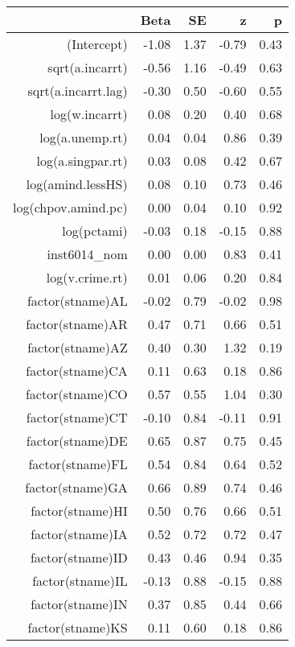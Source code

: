 \begin{table}[ht]
\centering
\begin{tabular}{rrrrr}
  \hline
 & Beta & SE & z & p \\ 
  \hline
(Intercept) & -1.08 & 1.37 & -0.79 & 0.43 \\ 
  sqrt(a.incarrt) & -0.56 & 1.16 & -0.49 & 0.63 \\ 
  sqrt(a.incarrt.lag) & -0.30 & 0.50 & -0.60 & 0.55 \\ 
  log(w.incarrt) & 0.08 & 0.20 & 0.40 & 0.68 \\ 
  log(a.unemp.rt) & 0.04 & 0.04 & 0.86 & 0.39 \\ 
  log(a.singpar.rt) & 0.03 & 0.08 & 0.42 & 0.67 \\ 
  log(amind.lessHS) & 0.08 & 0.10 & 0.73 & 0.46 \\ 
  log(chpov.amind.pc) & 0.00 & 0.04 & 0.10 & 0.92 \\ 
  log(pctami) & -0.03 & 0.18 & -0.15 & 0.88 \\ 
  inst6014\_nom & 0.00 & 0.00 & 0.83 & 0.41 \\ 
  log(v.crime.rt) & 0.01 & 0.06 & 0.20 & 0.84 \\ 
  factor(stname)AL & -0.02 & 0.79 & -0.02 & 0.98 \\ 
  factor(stname)AR & 0.47 & 0.71 & 0.66 & 0.51 \\ 
  factor(stname)AZ & 0.40 & 0.30 & 1.32 & 0.19 \\ 
  factor(stname)CA & 0.11 & 0.63 & 0.18 & 0.86 \\ 
  factor(stname)CO & 0.57 & 0.55 & 1.04 & 0.30 \\ 
  factor(stname)CT & -0.10 & 0.84 & -0.11 & 0.91 \\ 
  factor(stname)DE & 0.65 & 0.87 & 0.75 & 0.45 \\ 
  factor(stname)FL & 0.54 & 0.84 & 0.64 & 0.52 \\ 
  factor(stname)GA & 0.66 & 0.89 & 0.74 & 0.46 \\ 
  factor(stname)HI & 0.50 & 0.76 & 0.66 & 0.51 \\ 
  factor(stname)IA & 0.52 & 0.72 & 0.72 & 0.47 \\ 
  factor(stname)ID & 0.43 & 0.46 & 0.94 & 0.35 \\ 
  factor(stname)IL & -0.13 & 0.88 & -0.15 & 0.88 \\ 
  factor(stname)IN & 0.37 & 0.85 & 0.44 & 0.66 \\ 
  factor(stname)KS & 0.11 & 0.60 & 0.18 & 0.86 \\ 

\end{tabular}
\end{table}
